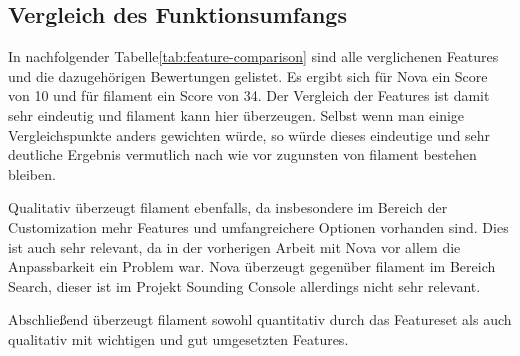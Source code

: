 \subsection{Vergleich des Funktionsumfangs}
In nachfolgender Tabelle\ref{tab:feature-comparison} sind alle verglichenen Features und die dazugehörigen Bewertungen gelistet.
Es ergibt sich für Nova ein Score von 10 und für filament ein Score von 34.
Der Vergleich der Features ist damit sehr eindeutig und filament kann hier überzeugen.
Selbst wenn man einige Vergleichspunkte anders gewichten würde, so würde dieses eindeutige und sehr deutliche Ergebnis vermutlich nach wie vor zugunsten von filament bestehen bleiben.

Qualitativ überzeugt filament ebenfalls, da insbesondere im Bereich der Customization mehr Features und umfangreichere Optionen vorhanden sind.
Dies ist auch sehr relevant, da in der vorherigen Arbeit mit Nova vor allem die Anpassbarkeit ein Problem war.
Nova überzeugt gegenüber filament im Bereich Search, dieser ist im Projekt Sounding Console allerdings nicht sehr relevant.

Abschließend überzeugt filament sowohl quantitativ durch das Featureset als auch qualitativ mit wichtigen und gut umgesetzten Features.


